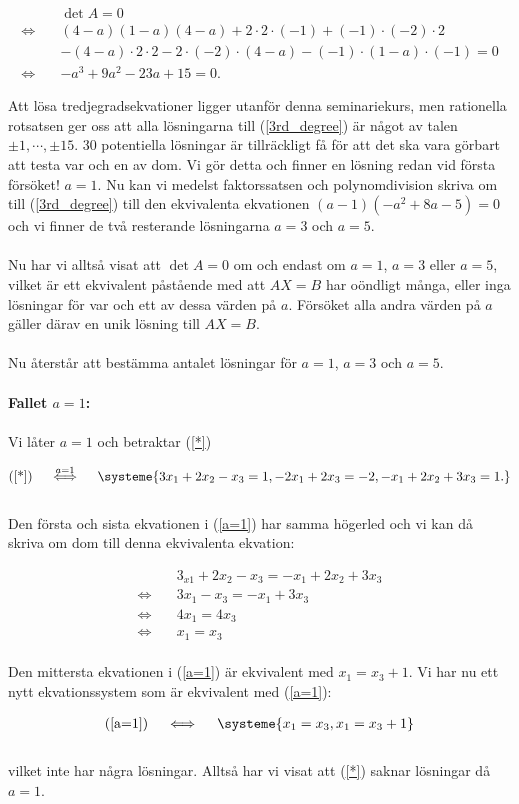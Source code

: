 \documentclass{article}
\begin{document}
\begin{align}
  &\det A = 0\nonumber\\
  \iff \quad &(4 - a)(1 - a)(4 - a) + 2\cdot2\cdot(-1) + (-1)\cdot(-2)\cdot2\nonumber\\
  &- (4 - a)\cdot2\cdot2 - 2\cdot(-2)\cdot(4 - a) - (-1)\cdot(1 - a)\cdot(-1) = 0\nonumber\\
  \iff \quad &-a^{3} + 9a^{2} -23a +15 = 0\text{.} \label{3rd_degree}
\end{align}

Att lösa tredjegradsekvationer ligger utanför denna seminariekurs, men rationella rotsatsen ger oss att alla lösningarna till (\ref{3rd_degree}) är något av talen $\pm1, \cdots, \pm 15$. 30 potentiella lösningar är tillräckligt få för att det ska vara görbart att testa var och en av dom. Vi gör detta och finner en lösning redan vid första försöket! $a = 1$. Nu kan vi medelst faktorssatsen och polynomdivision skriva om till (\ref{3rd_degree}) till den ekvivalenta ekvationen $(a-1)(-a^{2} + 8a - 5) = 0$ och vi finner de två resterande lösningarna $a = 3$ och $a = 5$.
\\
\\
Nu har vi alltså visat att $\det A = 0$ om och endast om $a = 1$, $a = 3$ eller $a = 5$, vilket är ett ekvivalent påstående med att $AX = B$ har oöndligt många, eller inga lösningar för var och ett av dessa värden på $a$. Försöket alla andra värden på $a$ gäller därav en unik lösning till $AX = B$.
\\
\\
Nu återstår att bestämma antalet lösningar för $a = 1$, $a = 3$ och $a = 5$.
\\
\\
\textbf{Fallet $a = 1$:}
\\
\\
Vi låter $a = 1$ och betraktar (\ref{*})

\begin{gather}
  \text{(\ref{*})} \quad \stackrel{a = 1}{\iff} \quad
  \systeme{
  3x_{1} + 2x_{2} - x_{3} = 1,
  -2x_{1} + 2x_{3} = -2,
  -x_{1} + 2x_{2} + 3x_{3} = 1 \text{.}
  } \label{a=1}
\end{gather}
\\
Den första och sista ekvationen i (\ref{a=1}) har samma högerled och vi kan då skriva om dom till denna ekvivalenta ekvation:

\begin{align*}
  \quad & 3_{x1} + 2x_{2} - x_{3} = -x_{1} + 2x_{2} + 3x_{3} \\
  \iff \quad & 3x_{1} - x_{3} = -x_{1} + 3x_{3} \\
  \iff \quad & 4x_{1} = 4x_{3} \\
  \iff \quad & x_{1} = x_{3}
\end{align*}
\\
Den mittersta ekvationen i (\ref{a=1}) är ekvivalent med $x_{1} = x_{3} + 1$. Vi har nu ett nytt ekvationssystem som är ekvivalent med (\ref{a=1}):

\begin{gather*}
  (\ref{a=1}) \quad \iff \quad
  \systeme{
  x_{1} = x_{3},
  x_{1} = x_{3} + 1
  }
\end{gather*}
\\
vilket inte har några lösningar. Alltså har vi visat att (\ref{*}) saknar lösningar då $a = 1$.
\end{document}
